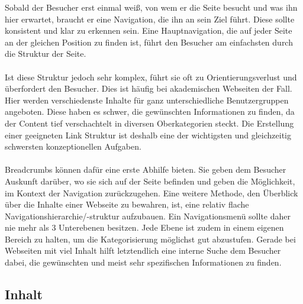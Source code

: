 Sobald der Besucher erst einmal weiß, von wem er die Seite besucht und was ihn hier erwartet, braucht er eine Navigation, die ihn an sein Ziel führt. Diese sollte konsistent und klar zu erkennen sein. Eine Hauptnavigation, die auf jeder Seite an der gleichen Position zu finden ist, führt den Besucher am einfachsten durch die Struktur der Seite.\\
\\
Ist diese Struktur jedoch sehr komplex, führt sie oft zu Orientierungsverlust und überfordert den Besucher. Dies ist häufig bei akademischen Webseiten der Fall. Hier werden verschiedenste Inhalte für ganz unterschiedliche Benutzergruppen angeboten. Diese haben es schwer, die gewünschten Informationen zu finden, da der Content tief verschachtelt in diversen Oberkategorien steckt. Die Erstellung einer geeigneten Link Struktur ist deshalb eine der wichtigsten und gleichzeitig schwersten konzeptionellen Aufgaben.\\
\\
\Gls{Breadcrumb}s können dafür eine erste Abhilfe bieten. Sie geben dem Besucher Auskunft darüber, wo sie sich auf der Seite befinden und geben die Möglichkeit, im Kontext der Navigation zurückzugehen. Eine weitere Methode, den Überblick über die Inhalte einer Webseite zu bewahren, ist, eine relativ flache Navigationshierarchie/-struktur aufzubauen. Ein Navigationsmenü sollte daher nie mehr als 3 Unterebenen besitzen. Jede Ebene ist zudem in einem eigenen Bereich zu halten, um die Kategorisierung möglichst gut abzustufen. Gerade bei Webseiten mit viel Inhalt hilft letztendlich eine interne Suche dem Besucher dabei, die gewünschten und meist sehr spezifischen Informationen zu finden.

\subsection{Inhalt}

